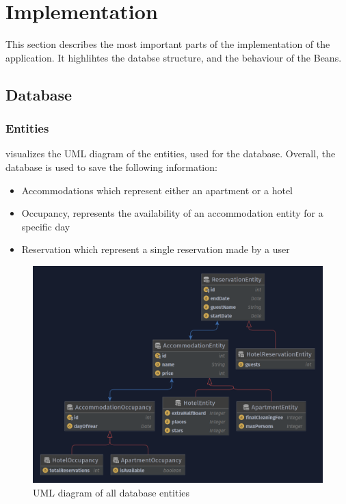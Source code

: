 \section{Implementation}\label{sec:02_impl}
This section describes the most important parts of the implementation of the application. It highlihtes the databse structure, and the behaviour of the Beans.


\subsection{Database}


\subsubsection{Entities}
 visualizes the UML diagram of the entities, used for the database.
Overall, the database is used to save the following information:
\begin{itemize}
\item Accommodations which represent either an apartment or a hotel
\item Occupancy, represents the availability of an accommodation entity for a specific day
\item Reservation which represent a single reservation made by a user
\end{itemize}

\begin{figure}[h]
\centering
\includegraphics[scale=0.3]{images/02_impl/entities}
\caption{UML diagram of all database entities}
\label{fig:02_impl_db_entities}
\end{figure}

